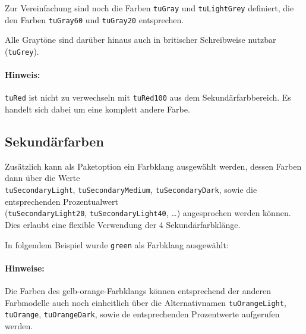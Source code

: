 
Zur Vereinfachung sind noch die Farben \lstinline{tuGray} und
\lstinline{tuLightGrey} definiert, die den Farben \lstinline{tuGray60} und
\lstinline{tuGray20} entsprechen.

Alle Graytöne sind darüber hinaus auch in britischer Schreibweise nutzbar
(\lstinline{tuGrey}).

\paragraph{Hinweis:}
\lstinline{tuRed} ist nicht zu verwechseln mit \lstinline{tuRed100} aus dem
Sekundärfarbbereich. Es handelt sich dabei um eine komplett andere Farbe.

\pagebreak
\subsection{Sekundärfarben}





Zusätzlich kann als Paketoption ein Farbklang ausgewählt werden, dessen Farben
dann über die Werte  \\\lstinline{tuSecondaryLight},
\lstinline{tuSecondaryMedium}, \lstinline{tuSecondaryDark}, sowie die
entsprechenden Prozentualwert \\(\lstinline{tuSecondaryLight20},
\lstinline{tuSecondaryLight40}, \ldots) angesprochen werden können.
Dies erlaubt eine flexible Verwendung der 4 Sekundärfarbklänge.

In folgendem Beispiel wurde \lstinline{green} als Farbklang ausgewählt:


\paragraph{Hinweise:}
Die Farben des gelb-orange-Farbklangs können entsprechend der anderen
Farbmodelle auch noch einheitlich über die Alternativnamen
\lstinline{tuOrangeLight}, \lstinline{tuOrange},
\lstinline{tuOrangeDark}, sowie de entsprechenden Prozentwerte aufgerufen
werden.

